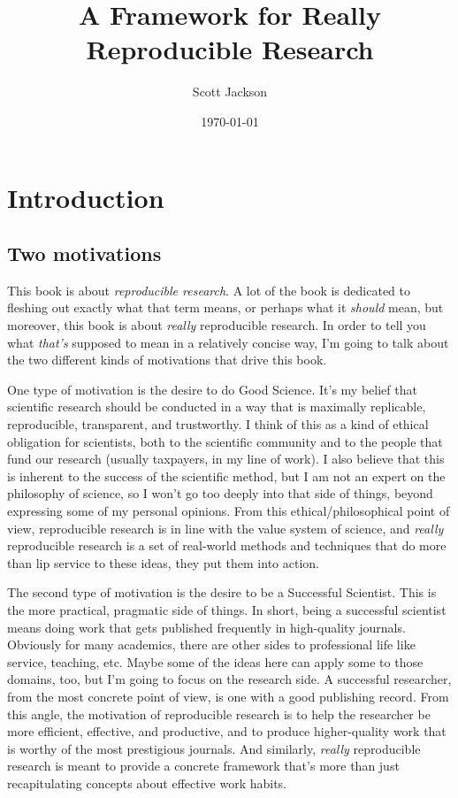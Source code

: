\documentclass{book}
\title{A Framework for Really Reproducible Research}
\author{Scott Jackson}
\date{\today}
\begin{document}
\maketitle

\setcounter{tocdepth}{3}
\tableofcontents
\vspace*{1cm}

\chapter{Introduction}
\label{sec-1}
\section{Two motivations}
\label{sec-1-1}

This book is about \emph{reproducible research}. A lot of the book is dedicated to fleshing out exactly what that term means, or perhaps what it \emph{should} mean, but moreover, this book is about \emph{really} reproducible research.  In order to tell you what \emph{that's} supposed to mean in a relatively concise way, I'm going to talk about the two different kinds of motivations that drive this book.

One type of motivation is the desire to do Good Science.  It's my belief that scientific research should be conducted in a way that is maximally replicable, reproducible, transparent, and trustworthy.  I think of this as a kind of ethical obligation for scientists, both to the scientific community and to the people that fund our research (usually taxpayers, in my line of work).  I also believe that this is inherent to the success of the scientific method, but I am not an expert on the philosophy of science, so I won't go too deeply into that side of things, beyond expressing some of my personal opinions.  From this ethical/philosophical point of view, reproducible research is in line with the value system of science, and \emph{really} reproducible research is a set of real-world methods and techniques that do more than lip service to these ideas, they put them into action.

The second type of motivation is the desire to be a Successful Scientist.  This is the more practical, pragmatic side of things. In short, being a successful scientist means doing work that gets published frequently in high-quality journals.  Obviously for many academics, there are other sides to professional life like service, teaching, etc.  Maybe some of the ideas here can apply some to those domains, too, but I'm going to focus on the research side. A successful researcher, from the most concrete point of view, is one with a good publishing record.  From this angle, the motivation of reproducible research is to help the researcher be more efficient, effective, and productive, and to produce higher-quality work that is worthy of the most prestigious journals. And similarly, \emph{really} reproducible research is meant to provide a concrete framework that's more than just recapitulating concepts about effective work habits.
\end{document}
